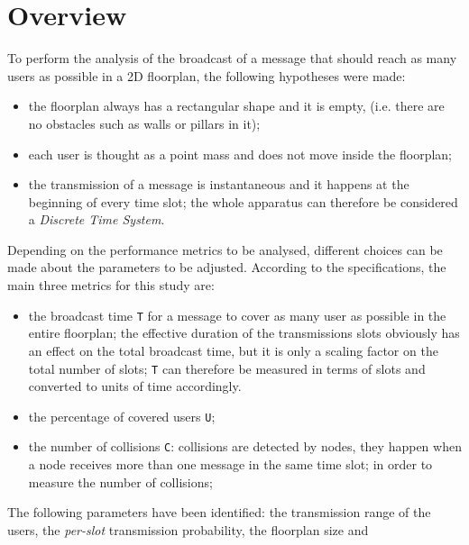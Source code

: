 %
\chapter{Overview}\label{overview}
To perform the analysis of the broadcast of a message that should reach as many
users as possible in a 2D floorplan, the following hypotheses were made:
\begin{itemize}
	\item the floorplan always has a rectangular shape and it is empty, (i.e.
	there are no obstacles such as walls or pillars in it);
	\item each user is thought as a point mass and does not move inside the
	floorplan;
	\item the transmission of a message is instantaneous and it happens at the
	beginning of every time slot; the whole apparatus can therefore be
	considered a \textit{Discrete Time System}.
\end{itemize}
Depending on the performance metrics to be analysed, different choices can be
made about the parameters to be adjusted. According to the specifications, the
main three metrics for this study are:
\begin{itemize}
	\item the broadcast time \colorbox{gray!30}{\large \texttt{T}} for a message
	to cover as many user as possible in the entire floorplan; the effective
	duration of the transmissions slots obviously has an effect
	on the total broadcast time, but it is only a scaling factor on the total
	number of slots; \texttt{T} can therefore be measured in terms of slots and
	converted to units of time accordingly.
	\item the percentage of covered users \colorbox{gray!30}{\large \texttt{U}};
	\item the number of collisions \colorbox{gray!30}{\large \texttt{C}}:
	collisions are detected by nodes, they happen when a node receives more than
	one message in the same time slot; in order to measure the number of
	collisions;
\end{itemize}
The following parameters have been identified: the transmission range of the
users, the \textit{per-slot} transmission probability, the floorplan size and
